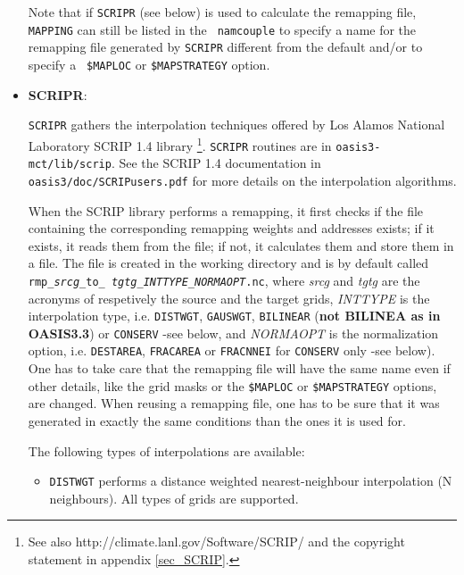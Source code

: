 \begin{itemize}
\begin{itemize}
  \end{itemize}

  Note that if {\tt SCRIPR} (see below) is used to calculate the
  remapping file, {\tt MAPPING} can still be listed in the {\tt
    namcouple} to specify a name for the remapping file generated by
  {\tt SCRIPR} different from the default and/or to specify a {\tt
    \$MAPLOC} or {\tt \$MAPSTRATEGY} option.

\item {\bf SCRIPR}:
 
  {\tt SCRIPR} gathers the interpolation techniques offered by Los
  Alamos National Laboratory SCRIP 1.4 library
  \citep{Jones99}\footnote{See also
    http://climate.lanl.gov/Software/SCRIP/ and the copyright
    statement in appendix \ref{sec_SCRIP}.}.  {\tt SCRIPR} routines
  are in {\tt oasis3-mct/lib/scrip}. See the SCRIP 1.4 documentation
  in {\tt oasis3/doc/SCRIPusers.pdf} for more details on the
  interpolation algorithms.

  When the SCRIP library performs a remapping, it first checks if the
  file containing the corresponding remapping weights and addresses
  exists; if it exists, it reads them from the file; if not, it
  calculates them and store them in a file. The file is created in the
  working directory and is by default called {\tt rmp\_{\it srcg}\_to\_{\it
      tgtg}\_{\it INTTYPE}\_{\it NORMAOPT}.nc}, where {\it srcg} and
  {\it tgtg} are the acronyms of respetively the source and the target
  grids, {\it INTTYPE} is the interpolation type, i.e. {\tt DISTWGT},
  {\tt GAUSWGT}, {\tt BILINEAR} ({\bf not BILINEA as in OASIS3.3}) or
  {\tt CONSERV} -see below, and {\it NORMAOPT} is the normalization
  option, i.e. {\tt DESTAREA}, {\tt FRACAREA} or {\tt FRACNNEI} for
  {\tt CONSERV} only -see below). One has to take care that the
  remapping file will have the same name even if other details, like
  the grid masks or the {\tt \$MAPLOC} or {\tt \$MAPSTRATEGY} options, 
  are changed. When reusing a remapping file, one has
  to be sure that it was generated in exactly the same conditions than
  the ones it is used for.

  The following types of interpolations are available:

  \begin{itemize}

  \item {\tt DISTWGT} performs a distance weighted nearest-neighbour
    interpolation (N neighbours). All types of grids are supported.


\end{itemize}
\end{itemize}
